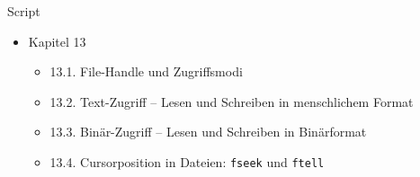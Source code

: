 
\begin{frame}{Script}
%
\begin{itemize}
\item Kapitel 13
	\begin{itemize}
	\item 13.1. File-Handle und Zugriffsmodi
	\item 13.2. Text-Zugriff – Lesen und Schreiben in menschlichem Format
	\item 13.3. Binär-Zugriff – Lesen und Schreiben in Binärformat
	\item 13.4. Cursorposition in Dateien: \texttt{fseek} und \texttt{ftell}
	\end{itemize}
\end{itemize}
%
\end{frame}


